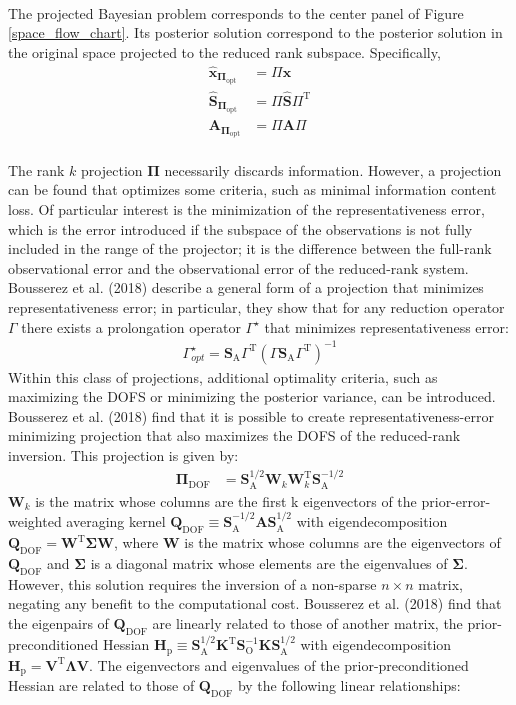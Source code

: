 \documentclass{article}
\newcommand{\popt}{\mathbf{\Pi_{\mathrm{opt}}}}
\newcommand{\g}{\Gamma}
\newcommand{\gstar}{\Gamma^{\star}}
\newcommand{\K}{\mathbf{K}}
\newcommand{\so}{\mathbf{S}_{\mathrm{O}}}
\newcommand{\sa}{\mathbf{S}_{\mathrm{A}}}
\newcommand{\xpost}{\mathbf{\hat{x}}}
\newcommand{\spost}{\mathbf{\hat{S}}}
\newcommand{\A}{\mathbf{A}}
\newcommand{\xpostpi}{\mathbf{\hat{x}}_{\popt}}
\newcommand{\spostpi}{\mathbf{\hat{S}}_{\popt}}
\newcommand{\Api}{\mathbf{A}_{\popt}}
\newcommand{\dof}[1]{#1_\mathrm{DOF}}
\begin{document}
{\\
The projected Bayesian problem corresponds to the center panel of Figure \ref{space_flow_chart}. Its posterior solution correspond to the posterior solution in the original space projected to the reduced rank subspace. Specifically,
\begin{align}
	\xpostpi &= \Pi \xpost\\
	\spostpi &= \Pi \spost \Pi^{\mathrm{T}}\\
	\Api &= \Pi \A \Pi	
\end{align}\\
The rank $k$ projection $\mathbf{\Pi}$ necessarily discards information. However, a projection can be found that optimizes some criteria, such as minimal information content loss. Of particular interest is the minimization of the representativeness error, which is the error introduced if the subspace of the observations is not fully included in the range of the projector; it is the difference between the full-rank observational error and the observational error of the reduced-rank system. Bousserez et al. (2018) describe a general form of a projection that minimizes representativeness error; in particular, they show that for any reduction operator $\g$ there exists a prolongation operator $\gstar$ that minimizes representativeness error:
\begin{align}
	\gstar_{opt} = \sa\g^{\mathrm{T}}(\g\sa\g^{\mathrm{T}})^{-1}
\end{align}
Within this class of projections, additional optimality criteria, such as maximizing the DOFS or minimizing the posterior variance, can be introduced. Bousserez et al. (2018) find that it is possible to create representativeness-error minimizing projection that also maximizes the DOFS of the reduced-rank inversion. This projection is given by:
\begin{align}\label{dof_projection}
	\dof{\mathbf{\Pi}} &= \sa^{1/2}\mathbf{W}_k\mathbf{W}_k^{\mathrm{T}}\sa^{-1/2}
\end{align}
$\mathbf{W}_k$ is the matrix whose columns are the first k eigenvectors of the prior-error-weighted averaging kernel $\dof{\mathbf{Q}} \equiv \sa^{-1/2}\A\sa^{1/2}$ with eigendecomposition $\dof{\mathbf{Q}} = \mathbf{W}^{\mathrm{T}} \mathbf{\Sigma} \mathbf{W}$, where $\mathbf{W}$ is the matrix whose columns are the eigenvectors of $\dof{\mathbf{Q}}$ and $\mathbf{\Sigma}$ is a diagonal matrix whose elements are the eigenvalues of $\mathbf{\Sigma}$. However, this solution requires the inversion of a non-sparse $n \times n$ matrix, negating any benefit to the computational cost. Bousserez et al. (2018) find that the eigenpairs of $\dof{\mathbf{Q}}$ are linearly related to those of another matrix, the prior-preconditioned Hessian $\mathbf{H}_{\mathrm{p}} \equiv \sa^{1/2}\K^{\mathrm{T}}\so^{-1}\K\sa^{1/2}$ with eigendecomposition $\mathbf{H}_{\mathrm{p}} = \mathbf{V}^{\mathrm{T}} \mathbf{\Lambda} \mathbf{V}$. The eigenvectors and eigenvalues of the prior-preconditioned Hessian are related to those of $\dof{\mathbf{Q}}$ by the following linear relationships:
}
\end{document}
